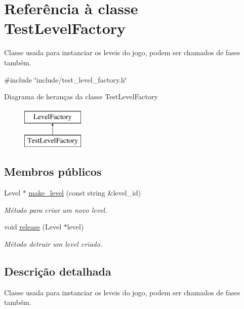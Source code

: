 \hypertarget{classTestLevelFactory}{}\section{Referência à classe Test\+Level\+Factory}
\label{classTestLevelFactory}


Classe usada para instanciar os leveis do jogo, podem ser chamados de fases também.  




{\ttfamily \#include \char`\"{}include/test\+\_\+level\+\_\+factory.\+h\char`\"{}}

Diagrama de heranças da classe Test\+Level\+Factory\begin{figure}[H]
\begin{center}
\leavevmode
\includegraphics[height=2.000000cm]{classTestLevelFactory}
\end{center}
\end{figure}
\subsection*{Membros públicos}
\begin{DoxyCompactItemize}
\item 
Level $\ast$ \mbox{\hyperlink{classTestLevelFactory_ab661866cd93b21b0fa16cfd72ace461e}{make\+\_\+level}} (const string \&level\+\_\+id)
\begin{DoxyCompactList}\small\item\em Método para criar um novo level. \end{DoxyCompactList}\item 
void \mbox{\hyperlink{classTestLevelFactory_a7771c01184257df25680ba0c8f3b5188}{release}} (Level $\ast$level)
\begin{DoxyCompactList}\small\item\em Método detruir um level criado. \end{DoxyCompactList}\end{DoxyCompactItemize}


\subsection{Descrição detalhada}
Classe usada para instanciar os leveis do jogo, podem ser chamados de fases também. 

